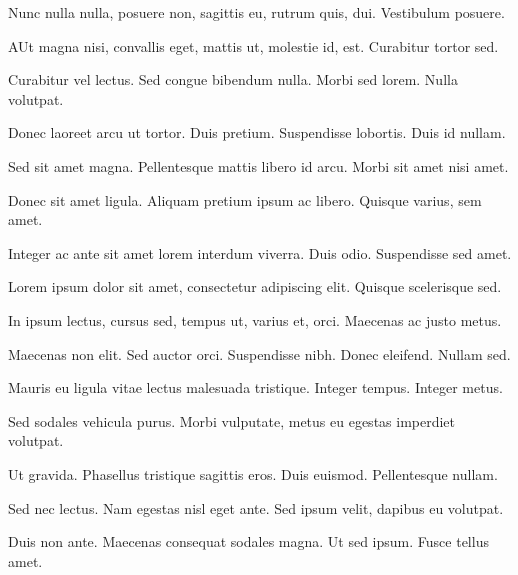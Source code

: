 \documentclass[letterpaper,10pt]{resume}
\begin{document}
            \begin{items}
                \item Nunc nulla nulla, posuere non, sagittis eu, rutrum quis, dui. Vestibulum posuere.
                \item AUt magna nisi, convallis eget, mattis ut, molestie id, est. Curabitur tortor sed.
                \item Curabitur vel lectus. Sed congue bibendum nulla. Morbi sed lorem. Nulla volutpat.
                \item Donec laoreet arcu ut tortor. Duis pretium. Suspendisse lobortis. Duis id nullam.
                \item Sed sit amet magna. Pellentesque mattis libero id arcu. Morbi sit amet nisi amet.
                \item Donec sit amet ligula. Aliquam pretium ipsum ac libero. Quisque varius, sem amet.
                \begin{items}
                    \item Integer ac ante sit amet lorem interdum viverra. Duis odio. Suspendisse sed amet.
                    \item Lorem ipsum dolor sit amet, consectetur adipiscing elit. Quisque scelerisque sed.
                    \item In ipsum lectus, cursus sed, tempus ut, varius et, orci. Maecenas ac justo metus.
                    \item Maecenas non elit. Sed auctor orci. Suspendisse nibh. Donec eleifend. Nullam sed.
                    \item Mauris eu ligula vitae lectus malesuada tristique. Integer tempus. Integer metus.
                \end{items}
            \end{items}
        \endplace
            \begin{items}
                \item Sed sodales vehicula purus. Morbi vulputate, metus eu egestas imperdiet volutpat.
                \item Ut gravida. Phasellus tristique sagittis eros. Duis euismod. Pellentesque nullam.
                \item Sed nec lectus. Nam egestas nisl eget ante. Sed ipsum velit, dapibus eu volutpat.
                \item Duis non ante. Maecenas consequat sodales magna. Ut sed ipsum. Fusce tellus amet.
            \end{items}
        \endplace
\end{document}
